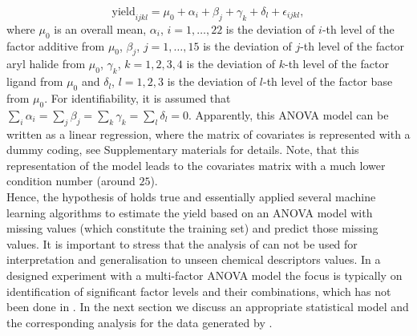 \documentclass[12pt]{article}
\begin{document}
$$
\mbox{yield}_{ijkl}=\mu_0+\alpha_i+\beta_j+\gamma_k+\delta_l+\epsilon_{ijkl},
$$
where $\mu_0$ is an overall mean, $\alpha_i$, $i=1,\ldots,22$ is the deviation of $i$-th level of the factor {\color{blue} additive} from $\mu_0$, $\beta_j$, $j=1,\ldots,15$ is the deviation of $j$-th level of the factor {\color{blue} aryl halide} from $\mu_0$, $\gamma_k$, $k=1,2,3,4$ is the deviation of $k$-th level of the factor {\color{blue} ligand} from $\mu_0$ and $\delta_l$, $l=1,2,3$ is the deviation of $l$-th level of the factor {\color{blue} base} from $\mu_0$. For identifiability, it is assumed that $\sum_i\alpha_i=\sum_j\beta_j=\sum_k\gamma_k=\sum_l\delta_l=0$. Apparently, this ANOVA model can be written as a linear regression, where the matrix of covariates is represented with a dummy coding, see Supplementary materials for details. Note, that this representation of the model leads to the covariates matrix with a much lower condition number (around $25$). \\
Hence, the hypothesis of \citet{Chuang2018} holds true and \citet{Ahneman2018} essentially applied several machine learning algorithms to estimate the yield based on an ANOVA model with missing values (which constitute the training set) and predict those missing values. It is important to stress that the analysis of \citet{Ahneman2018} can not be used for interpretation and generalisation to unseen chemical descriptors values. In a designed experiment with a multi-factor ANOVA model the focus is typically on identification of significant factor levels and their combinations, which has not been done in \citet{Ahneman2018}. In the next section we discuss an appropriate statistical model and the corresponding analysis for the data generated by \citet{Ahneman2018}.
\end{document}

